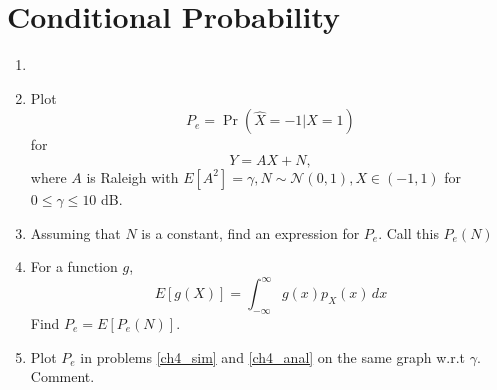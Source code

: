 \documentclass[journal,12pt,onecolumn]{IEEEtran}
\numberwithin{equation}{section}
\renewcommand\thesection{\arabic{section}}
\providecommand{\pr}[1]{\ensuremath{\Pr\left(#1\right)}}
\providecommand{\sbrak}[1]{\ensuremath{{}\left[#1\right]}}
\providecommand{\brak}[1]{\ensuremath{\left(#1\right)}}
\providecommand{\gauss}[2]{\mathcal{N}\ensuremath{\left(#1,#2\right)}}
\begin{document}
\section{Conditional Probability}
\begin{enumerate}[label=\thesection.\arabic*
        ,ref=\thesection.\theenumi]
    \item
    \item
          \label{ch4_sim}
          Plot
          \begin{equation}
              P_e = \pr{\hat{X} = -1|X=1}
          \end{equation}
          for
          \begin{equation}
              Y = AX+N,
          \end{equation}
          where $A$ is Raleigh with $E\sbrak{A^2} = \gamma, N \sim \gauss{0}{1}, X \in \brak{-1,1}$ for $0 \le \gamma \le 10$ dB.
    \item
          Assuming that $N$ is a constant, find an expression for $P_e$.  Call this $P_e(N)$
    \item
          \label{ch4_anal}
          For a function $g$,
          \begin{equation}
              E\sbrak{g(X)} = \int_{-\infty}^{\infty}g(x)p_{X}(x)\, dx
          \end{equation}
          Find $P_e = E\sbrak{P_e(N)}$.
    \item
          Plot $P_e$ in problems \ref{ch4_sim} and \ref{ch4_anal} on the same graph w.r.t $\gamma$.  Comment.
\end{enumerate}
\end{document}
